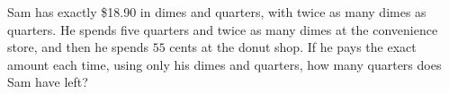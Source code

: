 Sam has exactly \$18.90 in dimes and quarters, with twice as many dimes as quarters. He spends five quarters and twice as many dimes at the convenience store, and then he spends $55$ cents at the donut shop. If he pays the exact amount each time, using only his dimes and quarters, how many quarters does Sam have left?
